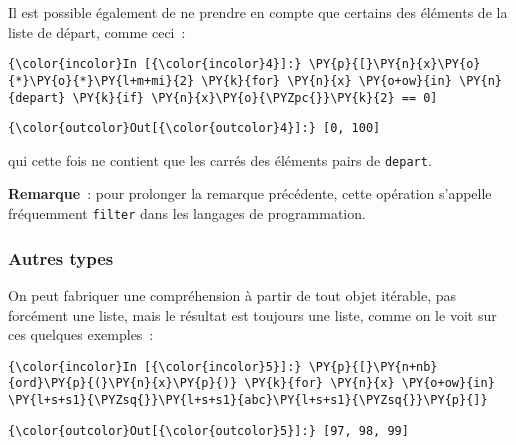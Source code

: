     Il est possible également de ne prendre en compte que certains des
éléments de la liste de départ, comme ceci~:

    \begin{Verbatim}[commandchars=\\\{\},frame=single,framerule=0.3mm,rulecolor=\color{cellframecolor}]
{\color{incolor}In [{\color{incolor}4}]:} \PY{p}{[}\PY{n}{x}\PY{o}{*}\PY{o}{*}\PY{l+m+mi}{2} \PY{k}{for} \PY{n}{x} \PY{o+ow}{in} \PY{n}{depart} \PY{k}{if} \PY{n}{x}\PY{o}{\PYZpc{}}\PY{k}{2} == 0]
\end{Verbatim}


\begin{Verbatim}[commandchars=\\\{\},frame=single,framerule=0.3mm,rulecolor=\color{cellframecolor}]
{\color{outcolor}Out[{\color{outcolor}4}]:} [0, 100]
\end{Verbatim}
            
    qui cette fois ne contient que les carrés des éléments pairs de
\texttt{depart}.

    \textbf{Remarque}~: pour prolonger la remarque précédente, cette
opération s'appelle fréquemment \texttt{filter} dans les langages de
programmation.

    \hypertarget{autres-types}{%
\subsubsection{Autres types}\label{autres-types}}

    On peut fabriquer une compréhension à partir de tout objet itérable, pas
forcément une liste, mais le résultat est toujours une liste, comme on
le voit sur ces quelques exemples~:

    \begin{Verbatim}[commandchars=\\\{\},frame=single,framerule=0.3mm,rulecolor=\color{cellframecolor}]
{\color{incolor}In [{\color{incolor}5}]:} \PY{p}{[}\PY{n+nb}{ord}\PY{p}{(}\PY{n}{x}\PY{p}{)} \PY{k}{for} \PY{n}{x} \PY{o+ow}{in} \PY{l+s+s1}{\PYZsq{}}\PY{l+s+s1}{abc}\PY{l+s+s1}{\PYZsq{}}\PY{p}{]}
\end{Verbatim}


\begin{Verbatim}[commandchars=\\\{\},frame=single,framerule=0.3mm,rulecolor=\color{cellframecolor}]
{\color{outcolor}Out[{\color{outcolor}5}]:} [97, 98, 99]
\end{Verbatim}
            
